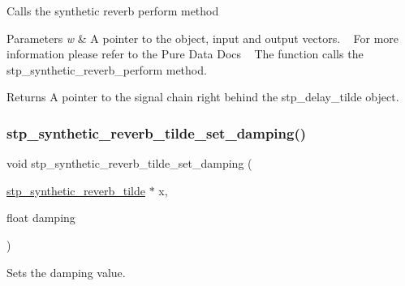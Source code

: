 Calls the synthetic reverb perform method ~\newline
 


\begin{DoxyParams}{Parameters}
{\em w} & A pointer to the object, input and output vectors. ~\newline
 For more information please refer to the Pure Data Docs ~\newline
 The function calls the stp\+\_\+synthetic\+\_\+reverb\+\_\+perform method. ~\newline
 \\
\hline
\end{DoxyParams}
\begin{DoxyReturn}{Returns}
A pointer to the signal chain right behind the stp\+\_\+delay\+\_\+tilde object. ~\newline
 
\end{DoxyReturn}
\mbox{\label{structstp__synthetic__reverb__tilde_a7abb5501ffa4060a2808ece2c4de8de2}} 
\subsubsection{\texorpdfstring{stp\+\_\+synthetic\+\_\+reverb\+\_\+tilde\+\_\+set\+\_\+damping()}{stp\_synthetic\_reverb\_tilde\_set\_damping()}}
{\footnotesize\ttfamily void stp\+\_\+synthetic\+\_\+reverb\+\_\+tilde\+\_\+set\+\_\+damping (\begin{DoxyParamCaption}\item[{\hyperlink{structstp__synthetic__reverb__tilde}{stp\+\_\+synthetic\+\_\+reverb\+\_\+tilde} $\ast$}]{x,  }\item[{float}]{damping }\end{DoxyParamCaption})\hspace{0.3cm}{\ttfamily [related]}}



Sets the damping value. ~\newline
 


